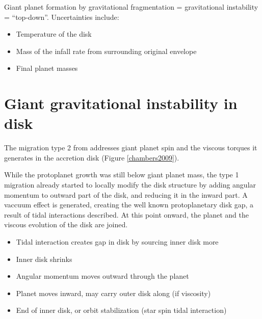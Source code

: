 \documentclass[12pt]{article} %
\begin{document}
\noindent Giant planet formation by gravitational fragmentation = gravitational instability = “top-down”. Uncertainties include:
\begin{itemize}
\setlength\itemsep{0em}
\item Temperature of the disk
\item Mass of the infall rate from surrounding original envelope
\item Final planet masses
\end{itemize}

\section{Giant gravitational instability in disk}\vspace{-2ex}\titlerule[1pt]\bigskip

The migration type 2 from \cite{chambers2009planetary} addresses giant planet spin and the viscous torques it generates in the accretion disk (Figure \ref{chambers2009}).\newline

\noindent While the protoplanet growth was still below giant planet mass, the type 1 migration already started to locally modify the disk structure by adding angular momentum to outward part of the disk, and reducing it in the inward part. A vaccuum effect is generated, creating the well known protoplanetary disk gap, a result of tidal interactions described. At this point onward, the planet and the viscous evolution of the disk are joined.

\begin{itemize}
\setlength\itemsep{0em}
\item Tidal interaction creates gap in disk by sourcing inner disk more
\item Inner disk shrinks
\item Angular momentum moves outward through the planet
\item Planet moves inward, may carry outer disk along (if viscosity)
\item End of inner disk, or orbit stabilization (star spin tidal interaction)
\end{itemize}
\end{document}
